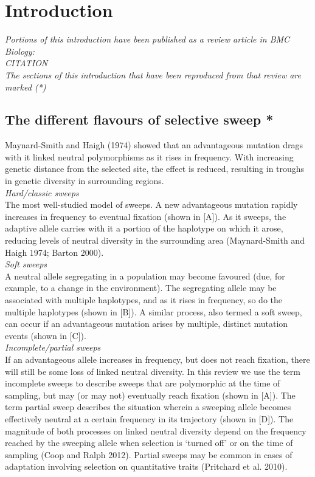 \chapter{Introduction}

\emph{Portions of this introduction have been published as a review article in BMC Biology: \\CITATION\\The sections of this introduction that have been reproduced from that review are marked (*)}

\section[Selective sweep models]{The different flavours of selective sweep *}

Maynard-Smith and Haigh (1974) showed that an advantageous mutation drags with it linked neutral polymorphisms as it rises in frequency. With increasing genetic distance from the selected site, the effect is reduced, resulting in troughs in genetic diversity in surrounding regions. \\
 
\emph{Hard/classic sweeps} \\
 
The most well-studied model of sweeps. A new advantageous mutation rapidly increases in frequency to eventual fixation (shown in [A]). As it sweeps, the adaptive allele carries with it a portion of the haplotype on which it arose, reducing levels of neutral diversity in the surrounding area (Maynard-Smith and Haigh 1974; Barton 2000). \\
 
\emph{Soft sweeps} \\
  
A neutral allele segregating in a population may become favoured (due, for example, to a change in the environment). The segregating allele may be associated with multiple haplotypes, and as it rises in frequency, so do the multiple haplotypes (shown in [B]). A similar process, also termed a soft sweep, can occur if an advantageous mutation arises by multiple, distinct mutation events (shown in [C]). \\
 
\emph{Incomplete/partial sweeps} \\
 
If an advantageous allele increases in frequency, but does not reach fixation, there will still be some loss of linked neutral diversity. In this review we use the term incomplete sweeps to describe sweeps that are polymorphic at the time of sampling, but may (or may not) eventually reach fixation (shown in [A]). The term partial sweep describes the situation wherein a sweeping allele becomes effectively neutral at a certain frequency in its trajectory (shown in [D]). The magnitude of both processes on linked neutral diversity depend on the frequency reached by the sweeping allele when selection is ‘turned off’ or on the time of sampling (Coop and Ralph 2012). Partial sweeps may be common in cases of adaptation involving selection on quantitative traits (Pritchard et al. 2010). \\

